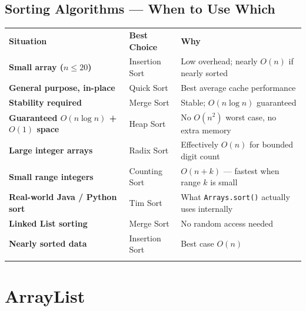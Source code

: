 \documentclass[12pt,a4paper,oneside]{book}
\renewcommand{\arraystretch}{1.35}
\begin{document}
\section{Sorting Algorithms --- When to Use Which}

\begin{center}
\renewcommand{\arraystretch}{1.55}
\setlength{\tabcolsep}{9pt}
\begin{tabular}{
  !{\color{myblue}\vrule width 1.2pt}
  >{\bfseries}p{5.2cm}
  !{\color{myblue!40}\vrule}
  p{2.8cm}
  !{\color{myblue!40}\vrule}
  p{5.8cm}
  !{\color{myblue}\vrule width 1.2pt}
}
\hline
{}
\color{white}\textbf{Situation} &
\color{white}\textbf{Best Choice} &
\color{white}\textbf{Why}\\
\hline
Small array ($n \leq 20$)        & Insertion Sort & Low overhead; nearly $O(n)$ if nearly sorted\\
General purpose, in-place        & Quick Sort     & Best average cache performance\\
Stability required               & Merge Sort     & Stable; $O(n \log n)$ guaranteed\\
Guaranteed $O(n \log n)$ + $O(1)$ space & Heap Sort & No $O(n^2)$ worst case, no extra memory\\
Large integer arrays             & Radix Sort     & Effectively $O(n)$ for bounded digit count\\
Small range integers             & Counting Sort  & $O(n + k)$ --- fastest when range $k$ is small\\
Real-world Java / Python sort    & Tim Sort       & What \texttt{Arrays.sort()} actually uses internally\\
Linked List sorting              & Merge Sort     & No random access needed\\
Nearly sorted data               & Insertion Sort & Best case $O(n)$\\
\hline
\end{tabular}
\end{center}

\chapter{ArrayList}
\end{document}
